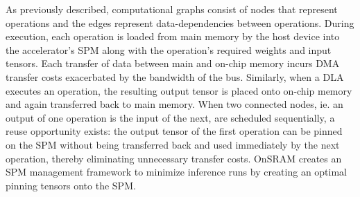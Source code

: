 



As previously described, computational graphs consist of nodes that represent
operations and the edges represent data-dependencies between operations. During
execution, each operation is loaded from main memory by the host device into
the accelerator's SPM along with the operation's required weights and input
tensors. Each transfer of data between main and on-chip memory incurs DMA
transfer costs exacerbated by the bandwidth of the bus. Similarly, when a DLA
executes an operation, the resulting output tensor is placed onto on-chip
memory and again transferred back to main memory. When two connected nodes,
ie. an output of one operation is the input of the next, are scheduled
sequentially, a reuse opportunity exists: the output tensor of the first
operation can be pinned on the SPM without being transferred back and used
immediately by the next operation, thereby eliminating unnecessary transfer
costs. OnSRAM creates an SPM management framework to minimize inference runs
by creating an optimal pinning tensors onto the SPM.

